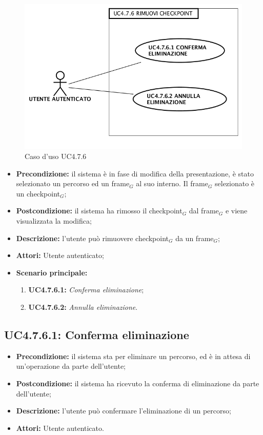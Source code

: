 \begin{figure}[h]
	\begin{center}
	\includegraphics[scale=0.4]{diagram/UC4-7-6.png}
	\caption{Caso d'uso UC4.7.6}
	\end{center}
\end{figure}
\begin{itemize}
	\item \textbf{Precondizione:} il sistema è in fase di modifica della presentazione, è stato selezionato un percorso ed un frame$_G$ al suo interno. Il frame$_G$ selezionato è un checkpoint$_G$;
	\item \textbf{Postcondizione:} il sistema ha rimosso il checkpoint$_G$ dal frame$_G$ e viene visualizzata la modifica;
	\item \textbf{Descrizione:} l'utente può rimuovere checkpoint$_G$ da un frame$_G$;
	\item \textbf{Attori:} Utente autenticato;
	\item \textbf{Scenario principale:}
	\begin{enumerate}
		\item \textbf{ UC4.7.6.1:} \textit{ Conferma eliminazione};
		\item \textbf{ UC4.7.6.2:} \textit{ Annulla eliminazione}.
	\end{enumerate}
\end{itemize}
\subsection{ UC4.7.6.1: Conferma eliminazione}

\begin{itemize}
	\item \textbf{Precondizione:} il sistema sta per eliminare un percorso, ed è in attesa di un'operazione da parte dell'utente;
	\item \textbf{Postcondizione:} il sistema ha ricevuto la conferma di eliminazione da parte dell'utente;
	\item \textbf{Descrizione:} l'utente può confermare l'eliminazione di un percorso;
	\item \textbf{Attori:} Utente autenticato.
\end{itemize}
